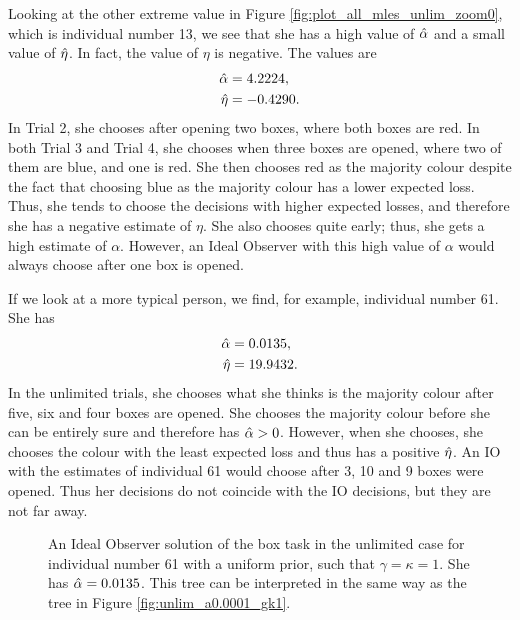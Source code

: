 Looking at the other extreme value in Figure \ref{fig:plot_all_mles_unlim_zoom0}, which is individual number 13, we see that she has a high value of $\hat{\alpha}$ and a small value of $\hat{\eta}$. In fact, the value of $\eta$ is negative. The values are
\begin{equation}
\label{mles_unlim_person13}
    \begin{aligned}
        \hat{\alpha} &= 4.2224,\\
        \hat{\eta} &= -0.4290.
    \end{aligned}
\end{equation}
In Trial 2, she chooses after opening two boxes, where both boxes are red. In both Trial 3 and Trial 4, she chooses when three boxes are opened, where two of them are blue, and one is red. She then chooses red as the majority colour despite the fact that choosing blue as the majority colour has a lower expected loss. Thus, she tends to choose the decisions with higher expected losses, and therefore she has a negative estimate of $\eta$. She also chooses quite early; thus, she gets a high estimate of $\alpha$. However, an Ideal Observer with this high value of $\alpha$ would always choose after one box is opened.

If we look at a more typical person, we find, for example, individual number 61. She has
\begin{equation}
\label{mles_unilim_person61}
    \begin{aligned}
        \hat{\alpha} &= 0.0135,\\
        \hat{\eta} &= 19.9432.
    \end{aligned}
\end{equation}
In the unlimited trials, she chooses what she thinks is the majority colour after five, six and four boxes are opened. She chooses the majority colour before she can be entirely sure and therefore has $\hat{\alpha}>0$. However, when she chooses, she chooses the colour with the least expected loss and thus has a positive $\hat{\eta}$. An IO with the estimates of individual 61 would choose after 3, 10 and 9 boxes were opened. Thus her decisions do not coincide with the IO decisions, but they are not far away.  
\begin{figure}
    \centering
    \scalebox{0.7}{}
    \caption[Ideal Observer solution individual 61, unlimited. $\gamma=\kappa=1$]{An Ideal Observer solution of the box task in the unlimited case for individual number 61 with a uniform prior, such that $\gamma=\kappa=1$. She has $\hat{\alpha}=0.0135$. This tree can be interpreted in the same way as the tree in Figure \ref{fig:unlim_a0.0001_gk1}.}
    \label{fig:IO_sol_individual61}
\end{figure}

